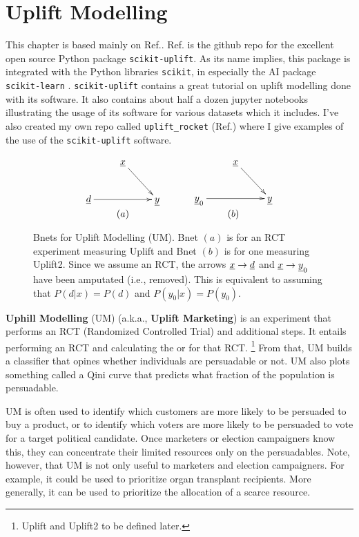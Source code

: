\chapter{Uplift Modelling}
\label{ch-uplift}


This chapter is based mainly on Ref.\cite{scikit-uplift}.
Ref.\cite{scikit-uplift} is the github repo for
the excellent open source Python package {\tt scikit-uplift}.
As its name implies, this package is
integrated with the Python libraries {\tt scikit}, in especially
the AI package {\tt scikit-learn} .
 {\tt scikit-uplift} contains a great tutorial 
 on uplift modelling
 done with its software. It also contains about half a dozen
jupyter notebooks illustrating the usage
of its software for various datasets which it includes. I've also created
my own repo called {\tt uplift\_rocket}
(Ref.\cite{uplift_rocket})
where I give examples of the use of
the {\tt scikit-uplift}  software.



\begin{figure}[h!]
$$\begin{array}{ccc}
\xymatrix{
&\rvx\ar[dr]
\\
\rvd\ar[rr]
&&\rvy
}
&\quad&
\xymatrix{
&\rvx\ar[dr]
\\
\rvy_0\ar[rr]
&&\rvy
}
\\
(a) &\quad & (b)
\end{array}
$$
\caption{Bnets for Uplift Modelling (UM). 
Bnet $(a)$ is for an RCT experiment measuring Uplift and Bnet $(b)$ is for one measuring Uplift2. 
 Since we assume an RCT, the arrows $\rvx\rarrow \rvd$ 
and $\rvx\rarrow \rvy_0$ have been amputated (i.e., removed). This is equivalent to assuming that $P(d|x)=P(d)$ and
$P(y_0|x)=P(y_0)$.
}
\label{fig-up-bnet}
\end{figure}


{\bf Uphill Modelling} (UM) (a.k.a., {\bf Uplift Marketing})
is an experiment that performs an
RCT (Randomized Controlled Trial) and additional steps. It 
entails performing an
RCT  and 
 calculating  the  or  for that  RCT.
 \footnote{Uplift and Uplift2 to be defined later.}
From that, UM builds a classifier that opines whether individuals are
persuadable or not. UM also plots something called a Qini curve that predicts
what fraction of the population is persuadable. 

UM is often used to identify which 
customers are more likely to be persuaded to buy a
product, or to identify which voters are more
likely to be persuaded to vote for a target political candidate.
Once marketers or election campaigners know this, they can concentrate their limited resources only on the persuadables. Note, however, that UM is not only useful
to marketers and election campaigners. For example, it could be used to prioritize organ transplant recipients. 
More generally, it can be used to
prioritize the allocation of 
a scarce resource.

